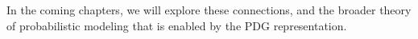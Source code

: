 In the coming chapters, we will explore these connections, and the broader theory of probabilistic modeling that is enabled by the PDG representation.
	
% 
% 
% 
% 
% 
% 



